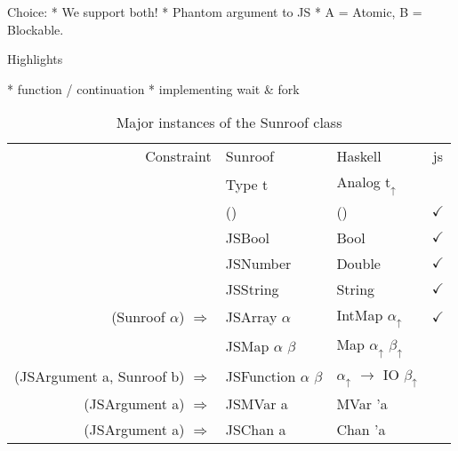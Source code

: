 \documentclass{llncs}
\newcommand{\HaskellAnalog}[1]{#1\ensuremath{_\uparrow}}
\begin{document}
Choice:
 * We support both!
 * Phantom argument to JS
 * A = Atomic, B = Blockable.

Highlights

 * function / continuation
 * implementing wait \& fork

\begin{table}
\caption{Major instances of the Sunroof class}
\begin{center}
\begin{tabular}{r@{\quad}l@{\quad}l@{\quad}c}
\hline\rule{0pt}{12pt}%
Constraint      & Sunroof   & Haskell  & js \\
                & Type t             & Analog \HaskellAnalog{t}\\
\hline\rule{0pt}{12pt}%
                & ()            & ()              & $\checkmark$ \\
                & JSBool        & Bool            & $\checkmark$ \\
                & JSNumber      & Double          & $\checkmark$ \\
                & JSString      & String          & $\checkmark$ \\
 (Sunroof $\alpha$) $\Rightarrow$      & JSArray $\alpha$     & IntMap $\HaskellAnalog{\alpha}$
                                                  & $\checkmark$ \\
                    & JSMap $\alpha$ $\beta$ 
                                & Map $\HaskellAnalog{\alpha}$ $\HaskellAnalog{\beta}$ & \\
 (JSArgument a, Sunroof b) $\Rightarrow$
                & JSFunction $\alpha$ $\beta$ 
                                & $\HaskellAnalog{\alpha}$ $\rightarrow$ IO $\HaskellAnalog{\beta}$
                                                  & \\
 (JSArgument a) $\Rightarrow$& JSMVar a& MVar 'a           \\
 (JSArgument a) $\Rightarrow$& JSChan a& Chan 'a           \\[2pt]
\hline
\end{tabular}
\end{center}
\end{table} 
\end{document}
